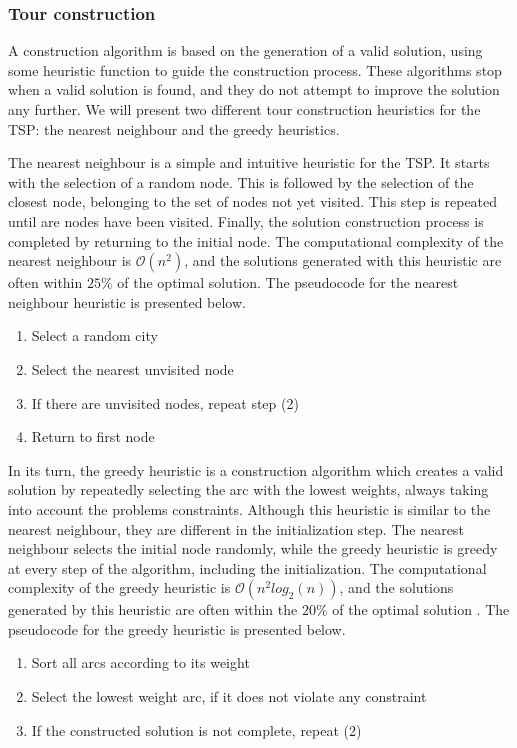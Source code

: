 \subsubsection{Tour construction}

A construction algorithm is based on the generation of a valid solution, using some heuristic function to guide the construction process. These algorithms stop when a valid solution is found, and they do not attempt to improve the solution any further. We will present two different tour construction heuristics for the TSP: the nearest neighbour and the greedy heuristics.

The nearest neighbour is a simple and intuitive heuristic for the TSP. It starts with the selection of a random node. This is followed by the selection of the closest node, belonging to the set of nodes not yet visited. This step is repeated until are nodes have been visited. Finally, the solution construction process is completed by returning to the initial node. The computational complexity of the nearest neighbour is $\mathcal{O}(n^2)$, and the solutions generated with this heuristic are often within $25\%$ of the optimal solution. The pseudocode for the nearest neighbour heuristic is presented below.

\begin{enumerate}
  \item Select a random city
  \item Select the nearest unvisited node
  \item If there are unvisited nodes, repeat step (2)
  \item Return to first node
\end{enumerate}

In its turn, the greedy heuristic is a construction algorithm which creates a valid solution by repeatedly selecting the arc with the lowest weights, always taking into account the problems constraints. Although this heuristic is similar to the nearest neighbour, they are different in the initialization step. The nearest neighbour selects the initial node randomly, while the greedy heuristic is greedy at every step of the algorithm, including the initialization. The computational complexity of the greedy heuristic is $\mathcal{O}(n^2log_2(n))$, and the solutions generated by this heuristic are often within the $20\%$ of the optimal solution . The pseudocode for the greedy heuristic is presented below. 

\begin{enumerate}
  \item Sort all arcs according to its weight
  \item Select the lowest weight arc, if it does not violate any constraint
  \item If the constructed solution is not complete, repeat (2)
\end{enumerate}
